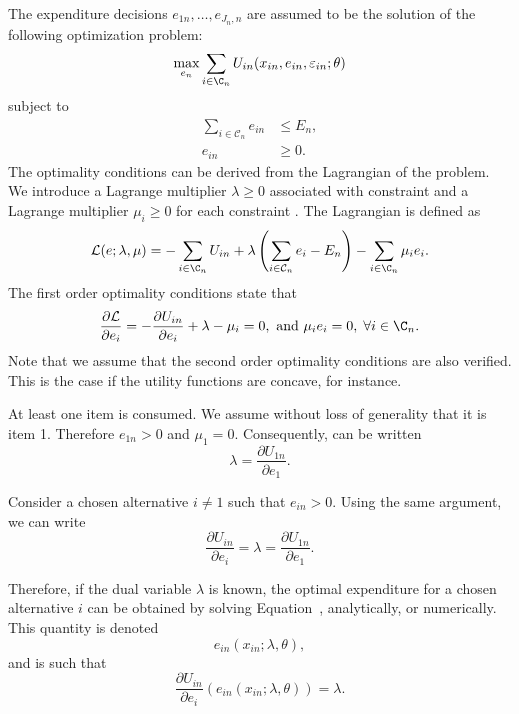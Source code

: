 \documentclass[12pt,a4paper]{article}
\renewcommand{\L}{\mathcal{L}}
\begin{document}
The expenditure decisions $e_{1n}, \ldots, e_{J_n, n}$ are assumed to be the solution of the following optimization problem:
\begin{equation}
\label{eq:obj}
\max_{e_n} \sum_{i \in \C_n} U_{in}(x_{in}, e_{in}, \varepsilon_{in}; \theta)
\end{equation}
subject to
\begin{align}
  \sum_{i \in \mathcal{C}_n} e_{in} & \leq E_n,\label{eq:budget_constraint}\\
 e_{in} &\geq 0. \label{eq:non_negativity}
\end{align}
The optimality conditions can be derived from the Lagrangian of the problem. We introduce a Lagrange multiplier $\lambda \geq 0$
associated with constraint  and a Lagrange multiplier $\mu_i \geq 0$ for each constraint . The Lagrangian is defined as
\begin{equation}
  \L(e;\lambda, \mu) = -\sum_{i \in \C_n} U_{in} + \lambda\left(\sum_{i \in \mathcal{C}_n} e_{i}-E_n\right) - \sum_{i \in \C_n} \mu_i e_i.
\end{equation}
The first order optimality conditions state that
\begin{equation}
  \label{eq:optimality}
\frac{\partial \L}{\partial e_i} = - \frac{\partial U_{in}}{\partial e_i} + \lambda - \mu_i  = 0, \text{ and } \mu_i e_i = 0, \; \forall i \in \C_n.
\end{equation}
Note that we assume that the second order optimality conditions are also verified. This is the case if the utility functions are concave, for instance.

At least one item is consumed. We assume without loss of generality that it is item 1. Therefore $e_{1n} > 0$ and $\mu_1=0$. Consequently,  can be written
\begin{equation}
    \label{eq:optimality_one}
\lambda = \frac{\partial U_{1n}}{\partial e_1}.
\end{equation}

Consider a chosen alternative $i\neq 1$ such that $e_{in} > 0$. Using the same argument, we can write
\begin{equation}
    \label{eq:optimality_i}
\frac{\partial U_{in}}{\partial e_i} = \lambda= \frac{\partial U_{1n}}{\partial e_1}.
\end{equation}

Therefore, if the dual variable $\lambda$ is known, the optimal expenditure for a chosen alternative $i$ can be obtained by solving
Equation~, analytically, or numerically. This quantity is denoted
\begin{equation}
    \label{eq:optimal_consumption}
    e_{in}(x_{in}; \lambda, \theta),
\end{equation}
and is such that
\[
   \frac{\partial U_{in}}{\partial e_i}\left(e_{in}(x_{in}; \lambda, \theta)\right) = \lambda.
\]
\end{document}
